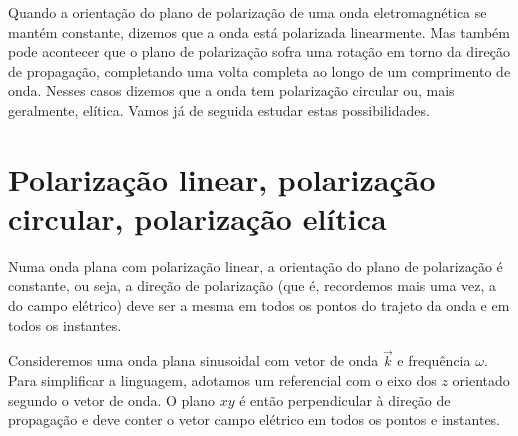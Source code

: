 Quando a orientação do plano de polarização de uma onda eletromagnética se
mantém constante, dizemos que a onda está polarizada linearmente. Mas também
pode acontecer que o plano de polarização sofra uma rotação em torno da direção
de propagação, completando uma volta completa ao longo de um comprimento de
onda. Nesses casos dizemos que a onda tem polarização circular ou, mais
geralmente, elítica. Vamos já de seguida estudar estas possibilidades.

\section{Polarização linear, polarização circular, polarização elítica}
Numa onda plana com polarização linear, a orientação do plano de polarização
é constante, ou seja, a direção de polarização (que é, recordemos mais uma vez,
a do campo elétrico) deve ser a mesma em todos os pontos do trajeto da onda e em
todos os instantes.

Consideremos uma onda plana sinusoidal com vetor de onda $\vec k$ e frequência
$\omega$. Para simplificar a linguagem, adotamos um referencial com o eixo dos
$z$ orientado segundo o vetor de onda. O plano $xy$ é então perpendicular à
direção de propagação e deve conter o vetor campo elétrico em todos os pontos e
instantes. 


